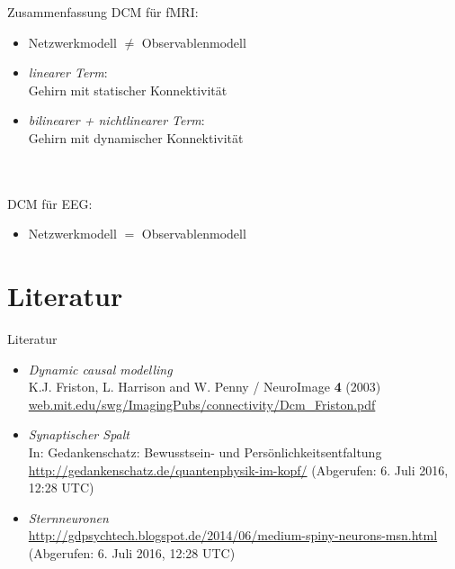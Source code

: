 \documentclass{beamer}
\begin{document}
\begin{frame}{Zusammenfassung}
DCM für fMRI:
\begin{itemize}
\item Netzwerkmodell $\neq$ Observablenmodell
\item \textit{linearer Term}:\\ Gehirn mit statischer Konnektivität
\item \textit{bilinearer + nichtlinearer Term}:\\ Gehirn mit dynamischer Konnektivität
\end{itemize}
\pause
~\\~\\
DCM für EEG:
\begin{itemize}
\item Netzwerkmodell $=$ Observablenmodell
\end{itemize}
\end{frame}


\section{Literatur}
	\begin{frame}{Literatur}
		\begin{itemize}
			\item \textit{Dynamic causal modelling} \\ {\small K.J. Friston, L. Harrison and W. Penny / NeuroImage \textbf{4} (2003)} \\ {\footnotesize \url{web.mit.edu/swg/ImagingPubs/connectivity/Dcm_Friston.pdf}}
			\item \textit{Synaptischer Spalt}\\  {\small In: Gedankenschatz: Bewusstsein- und Persönlichkeitsentfaltung}\\{\footnotesize \url{http://gedankenschatz.de/quantenphysik-im-kopf/}}  {\tiny(Abgerufen: 6. Juli 2016, 12:28 UTC)}
			\item \textit{Sternneuronen}\\{\footnotesize \url{http://gdpsychtech.blogspot.de/2014/06/medium-spiny-neurons-msn.html}}  {\tiny(Abgerufen: 6. Juli 2016, 12:28 UTC)}	
						
		\end{itemize}
	\end{frame}
	
\end{document}
